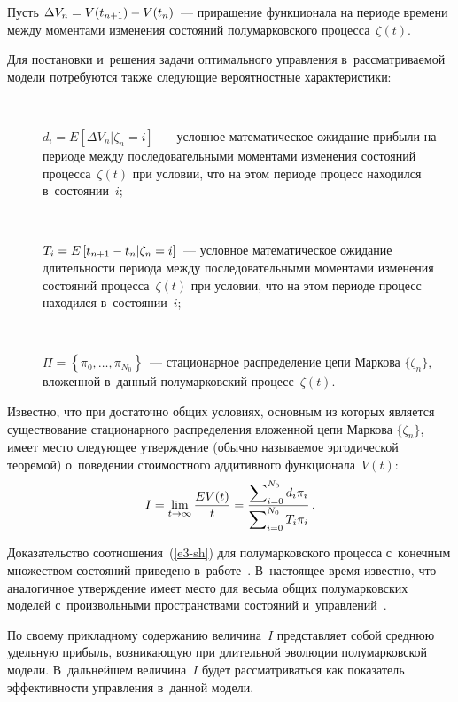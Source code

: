 \begin{multicols}{2}
  Пусть $\Delta V_n\hm= V(t_{n+1})\hm- V(t_n)$~--- приращение функционала 
на периоде времени между моментами изменения состояний полумарковского 
процесса~$\zeta(t)$. 
  
   Для постановки и~решения задачи оптимального управления 
в~рассматриваемой модели потребуются также следующие вероятностные 
ха\-рак\-те\-ри\-стики:
  \begin{description}
  \item[\,]
  $d_i=E\left[ \Delta V_n\vert \zeta_n=i\right]$~--- условное математическое 
ожидание прибыли на периоде между последовательными моментами 
изменения состояний процесса~$\zeta(t)$ при условии, что на этом периоде 
процесс находился в~состоянии~$i$; 
  \item[\,] $T_i=E\left[ t_{n+1}\hm- t_n\vert \zeta_n=i\right]$~--- условное 
математическое ожидание длительности периода между последовательными 
моментами изменения состояний процесса~$\zeta(t)$ при условии, что на этом 
периоде процесс находился в~состоянии~$i$;
  \item[\,]
  $\Pi=\left\{ \pi_0, \ldots , \pi_{N_0}\right\}$~--- стационарное распределение 
цепи Маркова $\{\zeta_n\}$, вложенной в~данный полумарковский 
процесс~$\zeta(t)$. 
\end{description}
  
  Известно, что при достаточно общих условиях, основным из которых 
является существование стационарного распределения вложенной цепи 
Маркова $\{\zeta_n\}$, имеет место следующее утверждение (обычно 
называемое эргодической теоремой) о~поведении стоимостного аддитивного 
функционала~$V(t)$: 
  \begin{equation}
  I=\lim\limits_{t\to\infty} \displaystyle\frac{\displaystyle EV(t)\mathstrut}{\displaystyle t\mathstrut}=\displaystyle\frac{\displaystyle \sum\nolimits_{i=0}^{N_0} d_i \pi_i 
\mathstrut}{\displaystyle \sum\nolimits^{N_0}_{i=0} T_i \pi_i\mathstrut}\,.
  \label{e3-sh}
  \end{equation}
  
  Доказательство соотношения~(\ref{e3-sh}) для полумарковского процесса с~конечным множеством состояний приведено в~работе~\cite{5-sh}. 
В~настоящее время известно, что аналогичное утверждение имеет место для 
весьма общих полумарковских моделей с~произвольными пространствами 
состояний и~управлений~\cite{8-sh}.
  
  По своему прикладному содержанию величина~$I$ представляет собой 
среднюю удельную прибыль, возникающую при длительной эволюции 
полумарковской модели. В~дальнейшем величина~$I$ будет 
рас\-смат\-ри\-вать\-ся как показатель эф\-фек\-тив\-ности управления в~данной модели. 
  

\end{multicols}

